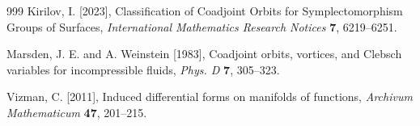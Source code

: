 \documentclass[11pt]{article}
\begin{document}
\begin{thebibliography}{999}
Kirilov, I. [2023], Classification of Coadjoint Orbits for Symplectomorphism Groups of Surfaces, \textit{International Mathematics Research Notices} {\bf 7}, 6219–6251. 


Marsden, J. E. and A. Weinstein [1983], Coadjoint orbits, vortices, and Clebsch variables for incompressible fluids, \textit{Phys. D} \textbf{7}, 305--323.


Vizman, C. [2011], Induced differential forms on manifolds of functions, 
\textit{Archivum Mathematicum} \textbf{47}, 201--215.



\end{thebibliography}
\end{document}

